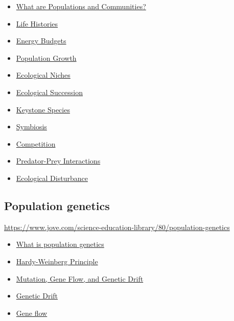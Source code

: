 \documentclass[
]{book}
\providecommand{\tightlist}{%
  \setlength{\itemsep}{0pt}\setlength{\parskip}{0pt}}
\begin{document}
\begin{itemize}
\tightlist
\item
  \href{https://www.jove.com/science-education/10939/what-are-populations-and-communities}{What are Populations and Communities?}
\item
  \href{https://www.jove.com/science-education/10940/distribution-and-dispersion}{Life Histories}
\item
  \href{jove.com/science-education/10942/energy-budgets}{Energy Budgets}
\item
  \href{https://www.jove.com/science-education/10943/population-growth}{Population Growth}
\item
  \href{https://www.jove.com/science-education/10968/ecological-niches}{Ecological Niches}
\item
  \href{https://www.jove.com/science-education/10991/ecological-succession}{Ecological Succession}
\item
  \href{https://www.jove.com/science-education/jovecore}{Keystone Species}
\item
  \href{https://www.jove.com/science-education/10944/symbiosis}{Symbiosis}
\item
  \href{https://www.jove.com/science-education/10993/competition}{Competition}
\item
  \href{https://www.jove.com/science-education/10996/predator-prey-interactions}{Predator-Prey Interactions}
\item
  \href{https://www.jove.com/science-education/11123/ecological-disturbance}{Ecological Disturbance}
\end{itemize}

\hypertarget{population-genetics}{%
\subsection{Population genetics}\label{population-genetics}}

\url{https://www.jove.com/science-education-library/80/population-genetics}

\begin{itemize}
\tightlist
\item
  \href{https://www.jove.com/science-education/10962/what-is-population-genetics}{What is population genetics}
\item
  \href{https://www.jove.com/science-education/10963/hardy-weinberg-principle}{Hardy-Weinberg Principle}
\item
  \href{https://www.jove.com/science-education/10964/mutation-gene-flow-and-genetic-drift}{Mutation, Gene Flow, and Genetic Drift}
\item
  \href{https://www.jove.com/science-education/11128/genetic-drift}{Genetic Drift}
\item
  \href{https://www.jove.com/science-education/11129/gene-flow}{Gene flow}
\end{itemize}
\end{document}
